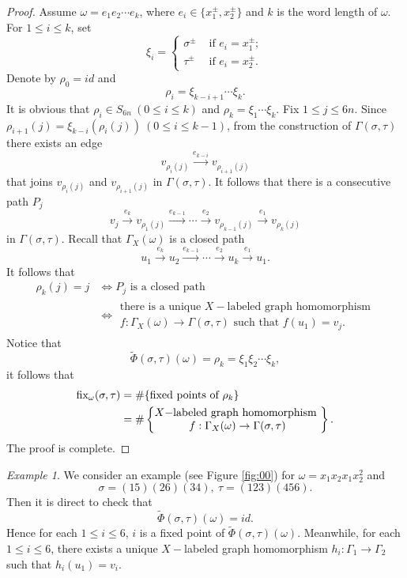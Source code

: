 \documentclass{amsart}
\theoremstyle{plain}
\theoremstyle{definition}
\theoremstyle{remark}
\newtheorem*{exam*}{Example}
\begin{document}
  \begin{proof}
  Assume $\omega=e_1e_2\cdots e_k$, where $e_i\in\{x_1^{\pm},x_2^{\pm}\}$ and $k$ is the word length of $\omega$.
      For $1\leq i\leq k$, set 
$$\xi_i=\begin{cases}
    \sigma^{\pm}&\text{ if }e_i=x_1^{\pm};
    \\
    \tau^{\pm}&\text{ if }e_i=x_2^{\pm}.
\end{cases}$$
Denote by $\rho_0=id$ and $$\rho_i=\xi_{k-i+1}\cdots\xi_k.$$
It is obvious that $\rho_i\in S_{6n}\ (0\leq i\leq k)$ and $\rho_k=\xi_{1}\cdots\xi_k$. Fix $1\leq j\leq 6n$. Since $\rho_{i+1}(j)=\xi_{k-i}(\rho_i(j))\ (0\leq i\leq k-1)$, from the construction of $\Gamma(\sigma,\tau)$ there
exists an edge $$v_{\rho_i(j)}\overset{e_{k-i}}{\to}v_{\rho_{i+1}(j)}$$ that joins $v_{\rho_i(j)}$ and $v_{\rho_{i+1}(j)}$ in $\Gamma(\sigma,\tau)$. It follows that there is a consecutive path $P_j$
$$v_j\overset{e_k}{\to}v_{\rho_1(j)}\overset{e_{k-1}}{\to}\cdots\overset{e_2}{\to}v_{\rho_{k-1}(j)}\overset{e_1}{\to} v_{\rho_{k}(j)}$$
in $\Gamma(\sigma,\tau)$.
Recall that $\Gamma_X(\omega)$ is a closed path 
$$u_1\overset{e_k}{\to}u_2\overset{e_{k-1}}{\to}\cdots\overset{e_2}{\to}u_k\overset{e_1}{\to}u_1.$$
It follows that
\begin{align*}
    \rho_k(j)=j
    &\Longleftrightarrow P_j\text{ is a closed path}\\
    &\Longleftrightarrow\begin{matrix}\text{there is a unique $X-$labeled graph homomorphism}\\ f:\Gamma_X(\omega)\to\Gamma(\sigma,\tau) \text{ such that $f(u_1)=v_j$.}\end{matrix}
\end{align*}
Notice that
$$\tilde{\Phi}(\sigma,\tau)(\omega)=\rho_k=\xi_1\xi_2\cdots\xi_k,$$
it follows that
\begin{align*}
    \textnormal{fix}_\omega(\sigma,\tau)&=\#\{\text{fixed points of }\rho_k\} \\
    &=\#\left\{\begin{matrix}\text{$X-$labeled graph homomorphism }\\ f:\Gamma_X(\omega)\to\Gamma(\sigma,\tau)\end{matrix}\right\}.
\end{align*}
The proof is complete.
  \end{proof}
\begin{exam*}
We consider an example (see Figure \ref{fig:00}) for $\omega=x_1x_2x_1x_2^2$ and 
$$\sigma=(15)(26)(34),\ \tau=(123)(456).$$
Then it is direct to check that $$\tilde{\Phi}(\sigma,\tau)(\omega)=id.$$
Hence for each $1\leq i\leq 6$, $i$ is a fixed point of $\tilde{\Phi}(\sigma,\tau)(\omega)$. Meanwhile, for each $1\leq i\leq 6$, there exists a unique $X-$labeled graph homomorphism $h_i:\Gamma_1\to \Gamma_2$ such that $h_i(u_1)=v_i$. 
\end{exam*}
\end{document}
